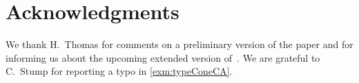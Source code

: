 \documentclass{amsart}
\theoremstyle{definition}
\begin{document}

\section*{Acknowledgments}

We thank H.~Thomas for comments on a preliminary version of the paper and for informing us about the upcoming extended version of~\cite{BazierMatteDouvilleMousavandThomasYildirim}.
We are grateful to C.~Stump for reporting a typo in \cref{exm:typeConeCA}.




\label{sec:biblio}
\end{document}
